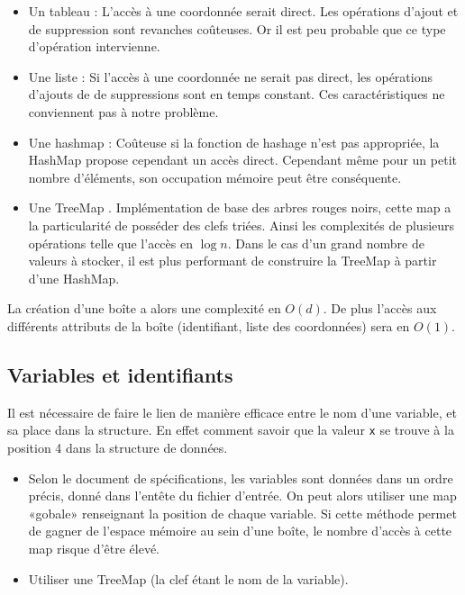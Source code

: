 \begin{itemize}
\item
  Un tableau : L'accès à une coordonnée serait direct. Les opérations d'ajout et de suppression sont revanches coûteuses. Or il est peu probable que ce type d'opération intervienne. 
\item
  Une liste : Si l'accès à une coordonnée ne serait pas direct, les opérations d'ajouts de de suppressions sont en temps constant. Ces caractéristiques ne conviennent pas à notre problème.
\item
  Une hashmap : Coûteuse si la fonction de hashage n'est pas appropriée, la HashMap propose cependant un accès direct. Cependant même pour un petit nombre d'éléments, son occupation mémoire peut être conséquente. 
\item
  Une TreeMap \cite{TreeMap}. Implémentation de base des arbres rouges noirs, cette map a la particularité de posséder des clefs triées. Ainsi les complexités de plusieurs opérations telle que l'accès en $\log{n}$. Dans le cas d'un grand nombre de valeurs à stocker, il est plus performant de construire la TreeMap à partir d'une HashMap.

\end{itemize}

La création d'une boîte a alors une complexité en $O(d)$. De plus l'accès aux différents attributs de la boîte (identifiant, liste des coordonnées) sera en $O(1)$.

\subsection{Variables et identifiants}
Il est nécessaire de faire le lien de manière efficace entre le nom d'une variable, et sa place dans la structure. En effet comment savoir que la valeur \verb+x+ se trouve à la position 4 dans la structure de données.
\begin{itemize}
\item
  Selon le document de spécifications, les variables sont données dans un ordre précis, donné dans l'entête du fichier d'entrée. On peut alors utiliser une map «gobale» renseignant la position de chaque variable. Si cette méthode permet de gagner de l'espace mémoire au sein d'une boîte, le nombre d'accès à cette map risque d'être élevé.
\item
  Utiliser une TreeMap (la clef étant le nom de la variable).
\end{itemize} 

